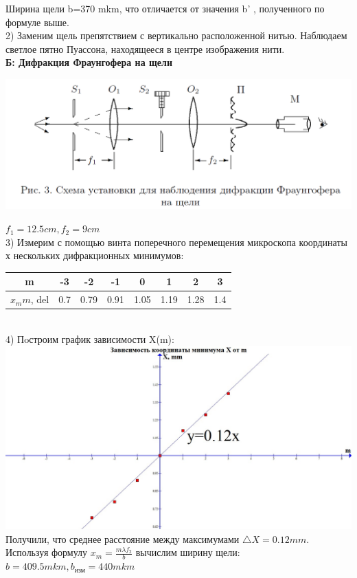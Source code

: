 \documentclass[a4paper,12pt]{article} %
\begin{document}
Ширина щели b=370 mkm, что отличается от значения b' , полученного по формуле выше. \\

2) Заменим щель препятствием с вертикально расположенной нитью. Наблюдаем светлое пятно Пуассона, находящееся в центре изображения нити.
\\
\textbf{Б: Дифракция Фраунгофера на щели}\\
\begin{center}

\includegraphics[scale=0.5]{2}
\end{center}
$f_1=12.5 cm  
   , f_2=9 cm $  \\
 3) Измерим с помощью винта поперечного перемещения микроскопа координаты х
нескольких дифракционных минимумов: \\
\begin{tabular}{|c|c|c|c|c|c|c|c|}
\hline 
m & -3 & -2 & -1 & 0 & 1 & 2 & 3 \\ 
\hline 
$x_mm$, del & 0.7	 & 0.79 & 0.91 & 1.05 & 1.19 & 1.28 & 1.4 \\ 
 
\hline 
\end{tabular} 
\\
 4) Пoстроим график зависимости X(m): \\
 \includegraphics[scale=0.33]{4311}
 \\
 Получили, что среднее расстояние между максимумами $\bigtriangleup X  = 0.12 mm .$ Используя формулу $x_m=\frac{m \lambda f_2}{b}$ вычислим ширину щели: $b = 409.5 mkm,   b_{\text{изм}} = 440 mkm$
 
\end{document}
